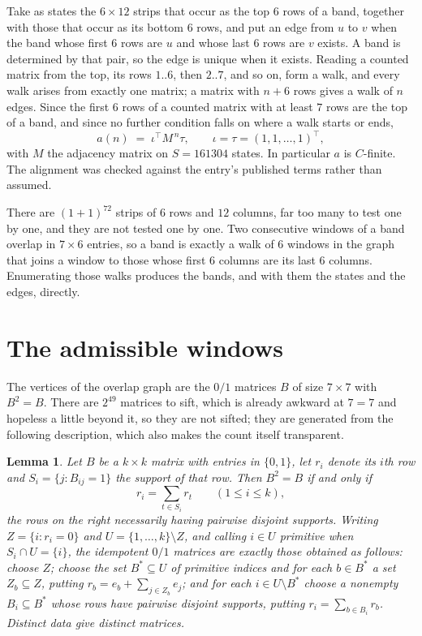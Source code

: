 \documentclass[11pt,a4paper]{article}
\theoremstyle{plain}
\newtheorem{lemma}[theorem]{Lemma}
\theoremstyle{definition}
\begin{document}
Take as states the $6\times12$ strips that occur as the top $6$ rows of a band,
together with those that occur as its bottom $6$ rows, and put an edge from $u$ to $v$
when the band whose first $6$ rows are $u$ and whose last $6$ rows are $v$ exists.
A band is determined by that pair, so the edge is unique when it exists. Reading a counted
matrix from the top, its rows $1..6$, then $2..7$, and so on, form a walk, and every
walk arises from exactly one matrix; a matrix with $n+6$ rows gives a walk of $n$ edges.
Since the first $6$ rows of a counted matrix with at least $7$ rows are the top of a
band, and since no further condition falls on where a walk starts or ends,
\[
a(n)\;=\;\iota^{\!\top}M^{\,n}\tau ,\qquad \iota=\tau=(1,1,\dots,1)^{\!\top},
\]
with $M$ the adjacency matrix on $S=161304$ states. In particular $a$ is $C$-finite. The
alignment was checked against the entry's published terms rather than assumed.

There are $(1 + 1)^{72}$ strips of $6$ rows and $12$ columns, far too
many to test one by one, and they are not tested one by one. Two consecutive windows of a band
overlap in $7\times6$ entries, so a band is exactly a walk of $6$ windows in
the graph that joins a window to those whose first $6$ columns are its last $6$
columns. Enumerating those walks produces the bands, and with them the states and the edges,
directly.

\section{The admissible windows}

The vertices of the overlap graph are the $0/1$ matrices $B$ of size $7\times7$ with
$B^2=B$. There are $2^{49}$ matrices to sift, which is already awkward at $7=7$ and
hopeless a little beyond it, so they are not sifted; they are generated from the following
description, which also makes the count itself transparent.

\begin{lemma}\label{lem:idem}
Let $B$ be a $k\times k$ matrix with entries in $\{0,1\}$, let $r_i$ denote its $i$th row and
$S_i=\{j:B_{ij}=1\}$ the support of that row. Then $B^2=B$ if and only if
\[
r_i=\sum_{t\in S_i}r_t \qquad (1\le i\le k),
\]
the rows on the right necessarily having pairwise disjoint supports. Writing
$Z=\{i:r_i=0\}$ and $U=\{1,\dots,k\}\setminus Z$, and calling $i\in U$ \emph{primitive}
when $S_i\cap U=\{i\}$, the idempotent $0/1$ matrices are exactly those obtained as follows:
choose $Z$; choose the set $B^{\ast}\subseteq U$ of primitive indices and for each
$b\in B^{\ast}$ a set $Z_b\subseteq Z$, putting $r_b=e_b+\sum_{j\in Z_b}e_j$; and for each
$i\in U\setminus B^{\ast}$ choose a nonempty $B_i\subseteq B^{\ast}$ whose rows have
pairwise disjoint supports, putting $r_i=\sum_{b\in B_i}r_b$. Distinct data give distinct
matrices.
\end{lemma}
\end{document}
